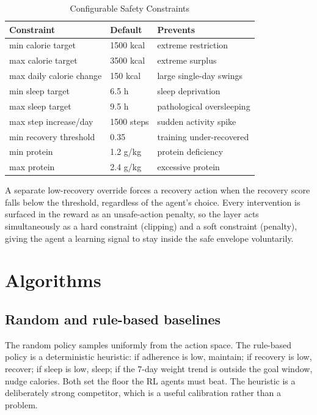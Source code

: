 \documentclass[conference]{IEEEtran}
\begin{document}
\begin{table}[!t]
\renewcommand{\arraystretch}{1.2}
\caption{Configurable Safety Constraints}
\label{tab:safety}
\centering
\footnotesize
\begin{tabular}{@{}lll@{}}
\toprule
\textbf{Constraint} & \textbf{Default} & \textbf{Prevents} \\
\midrule
min calorie target        & 1500 kcal   & extreme restriction \\
max calorie target        & 3500 kcal   & extreme surplus \\
max daily calorie change  & 150 kcal    & large single-day swings \\
min sleep target          & 6.5 h       & sleep deprivation \\
max sleep target          & 9.5 h       & pathological oversleeping \\
max step increase/day     & 1500 steps  & sudden activity spike \\
min recovery threshold    & 0.35        & training under-recovered \\
min protein               & 1.2 g/kg    & protein deficiency \\
max protein               & 2.4 g/kg    & excessive protein \\
\bottomrule
\end{tabular}
\end{table}

A separate low-recovery override forces a recovery action when the recovery
score falls below the threshold, regardless of the agent's choice. Every
intervention is surfaced in the reward as an unsafe-action penalty, so the layer
acts simultaneously as a hard constraint (clipping) and a soft constraint
(penalty), giving the agent a learning signal to stay inside the safe envelope
voluntarily.

\section{Algorithms}
\subsection{Random and rule-based baselines}
The random policy samples uniformly from the action space. The rule-based policy
is a deterministic heuristic: if adherence is low, maintain; if recovery is low,
recover; if sleep is low, sleep; if the 7-day weight trend is outside the goal
window, nudge calories. Both set the floor the RL agents must beat. The
heuristic is a deliberately strong competitor, which is a useful calibration
rather than a problem.
\end{document}

